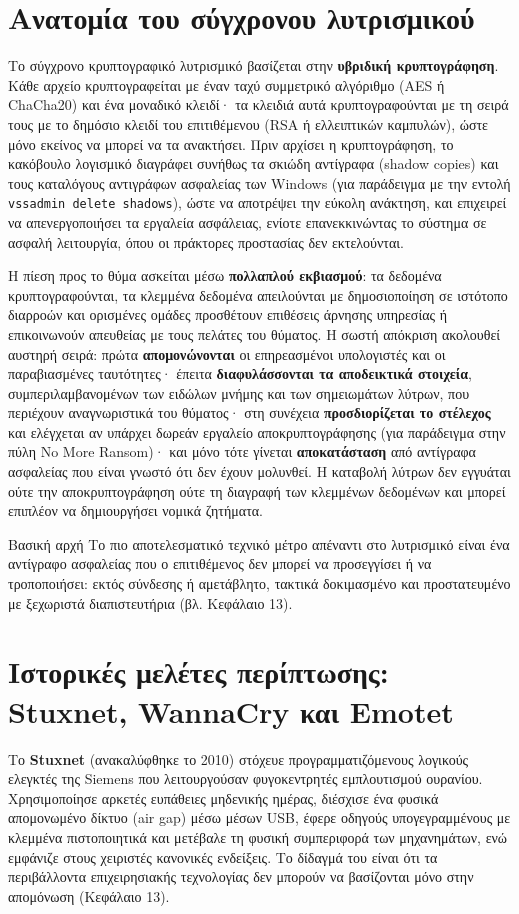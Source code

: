 \section{Ανατομία του σύγχρονου λυτρισμικού}\label{sec:4.5}
Το σύγχρονο κρυπτογραφικό λυτρισμικό βασίζεται στην \textbf{υβριδική κρυπτογράφηση}. Κάθε αρχείο κρυπτογραφείται με έναν ταχύ συμμετρικό αλγόριθμο (AES ή ChaCha20) και ένα μοναδικό κλειδί· τα κλειδιά αυτά κρυπτογραφούνται με τη σειρά τους με το δημόσιο κλειδί του επιτιθέμενου (RSA ή ελλειπτικών καμπυλών), ώστε μόνο εκείνος να μπορεί να τα ανακτήσει. Πριν αρχίσει η κρυπτογράφηση, το κακόβουλο λογισμικό διαγράφει συνήθως τα σκιώδη αντίγραφα (shadow copies) και τους καταλόγους αντιγράφων ασφαλείας των Windows (για παράδειγμα με την εντολή \texttt{vssadmin delete shadows}), ώστε να αποτρέψει την εύκολη ανάκτηση, και επιχειρεί να απενεργοποιήσει τα εργαλεία ασφάλειας, ενίοτε επανεκκινώντας το σύστημα σε ασφαλή λειτουργία, όπου οι πράκτορες προστασίας δεν εκτελούνται.

Η πίεση προς το θύμα ασκείται μέσω \textbf{πολλαπλού εκβιασμού}: τα δεδομένα κρυπτογραφούνται, τα κλεμμένα δεδομένα απειλούνται με δημοσιοποίηση σε ιστότοπο διαρροών και ορισμένες ομάδες προσθέτουν επιθέσεις άρνησης υπηρεσίας ή επικοινωνούν απευθείας με τους πελάτες του θύματος. Η σωστή απόκριση ακολουθεί αυστηρή σειρά: πρώτα \textbf{απομονώνονται} οι επηρεασμένοι υπολογιστές και οι παραβιασμένες ταυτότητες· έπειτα \textbf{διαφυλάσσονται τα αποδεικτικά στοιχεία}, συμπεριλαμβανομένων των ειδώλων μνήμης και των σημειωμάτων λύτρων, που περιέχουν αναγνωριστικά του θύματος· στη συνέχεια \textbf{προσδιορίζεται το στέλεχος} και ελέγχεται αν υπάρχει δωρεάν εργαλείο αποκρυπτογράφησης (για παράδειγμα στην πύλη No More Ransom)· και μόνο τότε γίνεται \textbf{αποκατάσταση} από αντίγραφα ασφαλείας που είναι γνωστό ότι δεν έχουν μολυνθεί. Η καταβολή λύτρων δεν εγγυάται ούτε την αποκρυπτογράφηση ούτε τη διαγραφή των κλεμμένων δεδομένων και μπορεί επιπλέον να δημιουργήσει νομικά ζητήματα.

\begin{keybox}{Βασική αρχή}
Το πιο αποτελεσματικό τεχνικό μέτρο απέναντι στο λυτρισμικό είναι ένα αντίγραφο ασφαλείας που ο επιτιθέμενος δεν μπορεί να προσεγγίσει ή να τροποποιήσει: εκτός σύνδεσης ή αμετάβλητο, τακτικά δοκιμασμένο και προστατευμένο με ξεχωριστά διαπιστευτήρια (βλ. Κεφάλαιο 13).
\end{keybox}

\section{Ιστορικές μελέτες περίπτωσης: Stuxnet, WannaCry και Emotet}\label{sec:4.6}
Το \textbf{Stuxnet} (ανακαλύφθηκε το 2010) στόχευε προγραμματιζόμενους λογικούς ελεγκτές της Siemens που λειτουργούσαν φυγοκεντρητές εμπλουτισμού ουρανίου. Χρησιμοποίησε αρκετές ευπάθειες μηδενικής ημέρας, διέσχισε ένα φυσικά απομονωμένο δίκτυο (air gap) μέσω μέσων USB, έφερε οδηγούς υπογεγραμμένους με κλεμμένα πιστοποιητικά και μετέβαλε τη φυσική συμπεριφορά των μηχανημάτων, ενώ εμφάνιζε στους χειριστές κανονικές ενδείξεις. Το δίδαγμά του είναι ότι τα περιβάλλοντα επιχειρησιακής τεχνολογίας δεν μπορούν να βασίζονται μόνο στην απομόνωση (Κεφάλαιο 13).

